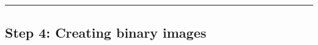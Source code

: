 \documentclass[11pt]{article}
\begin{document}
    \begin{center}
    \end{center}
    { \hspace*{\fill} \\}
    
    \begin{center}
    \end{center}
    { \hspace*{\fill} \\}
    
    \begin{center}\rule{0.5\linewidth}{\linethickness}\end{center}

\hypertarget{step-4-creating-binary-images}{%
\subsection{Step 4: Creating binary
images}\label{step-4-creating-binary-images}}
\end{document}
